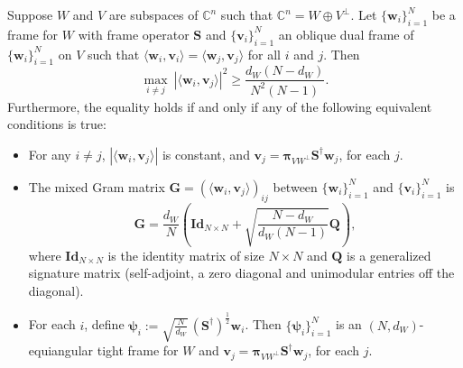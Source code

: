 \documentclass[10pt,a4paper]{amsart}
\newcommand{\bpi}{{\boldsymbol{\pi}}}
\begin{document}
\begin{theorem}\label{thm:mixedCoherence}
     Suppose $W$ and $V$ are subspaces of $\mathbb{C}^n$ such that $\mathbb{C}^n = W \oplus V^\perp$. Let $\{\mathbf{w}_i\}_{i=1}^N$ be a frame for $W$ with frame operator $\mathbf{S}$ and $\{\mathbf{v}_i\}_{i=1}^N$ an oblique dual frame of $\{\mathbf{w}_i\}_{i=1}^N$ on $V$ such that $\langle \mathbf{w}_i, \mathbf{v}_i \rangle = \langle \mathbf{w}_j, \mathbf{v}_j \rangle$ for all $i$ and $j$. Then
    \begin{equation*}
       \underset{i \neq j}{\max} \ |\langle \mathbf{w}_i, \mathbf{v}_j \rangle |^2 \geq \frac{d_W(N-d_W)}{N^2(N-1)}.
    \end{equation*}
Furthermore, the equality holds if and only if any of the following equivalent conditions is true:
\begin{itemize}
    \item[$(1)$] For any $i \neq j$, $|\langle \mathbf{w}_i, \mathbf{v}_j \rangle |$ is constant, and $\mathbf{v}_j = \bpi_{VW^\perp} \mathbf{S}^\dagger \mathbf{w}_j$, for each $j$. 
    \item[$(2)$] The mixed Gram matrix $\mathbf{G} = (\langle \mathbf{w}_i, \mathbf{v}_j \rangle)_{ij}$ between $\{\mathbf{w}_i\}_{i=1}^N$ and $\{\mathbf{v}_i\}_{i=1}^N$ is
    \begin{equation*}
        \mathbf{G} =\frac{d_W}{N} \left(\mathbf{Id}_{N \times N} + \sqrt{\frac{N-d_W}{d_W(N-1)}}\mathbf{Q}\right),
    \end{equation*}
    where $\mathbf{Id}_{N \times N}$ is the identity matrix of size $N \times N$ and $\mathbf{Q}$ is a generalized signature matrix (self-adjoint, a zero diagonal and unimodular entries off the diagonal). 
    \item[$(3)$] For each $i$, define $
\boldsymbol{\psi}_i :=  \sqrt{\tfrac{N}{d_W}} \, (\mathbf{S}^\dagger)^{\frac{1}{2}} \mathbf{w}_i$.
Then $\{\boldsymbol{\psi}_i\}_{i=1}^N$ is an $(N,d_W)$- equiangular tight frame for $W$ and $\mathbf{v}_j = \bpi_{VW^\perp} \mathbf{S}^\dagger \mathbf{w}_j$, for each $j$.
    
\end{itemize}
\end{theorem}
\end{document}
